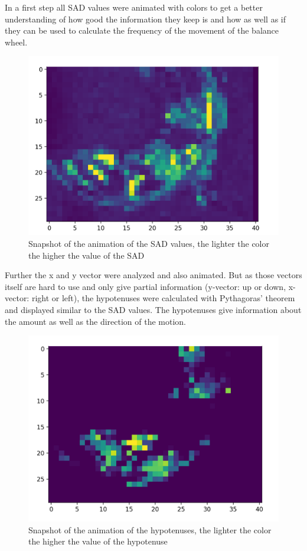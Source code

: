 \documentclass[12pt, a4paper]{report}
\begin{document}
    In a first step all SAD values were animated with colors to get a better understanding of how good the information they keep is and how as well as if they can be used to calculate the frequency of the movement of the balance wheel.
    
    \noindent
    \begin{figure}[H]
    \centering
    \includegraphics[scale=0.6]{Images/animation_sad.png}
    
    \caption{Snapshot of the animation of the SAD values, the lighter the color the higher the value of the SAD}
    \end{figure}
     
    Further the x and y vector were analyzed and also animated. But as those vectors itself are hard to use and only give partial information (y-vector: up or down, x-vector: right or left), the hypotenuses were calculated with Pythagoras' theorem and displayed similar to the SAD values. The hypotenuses give information about the amount as well as the direction of the motion.
    
    \noindent
    \begin{figure}[H]
    \centering
    \includegraphics[scale=0.6]{Images/animation_hypotenuse.png}
    
    \caption{Snapshot of the animation of the hypotenuses, the lighter the color the higher the value of the hypotenuse}
    \end{figure}
    
\end{document}
